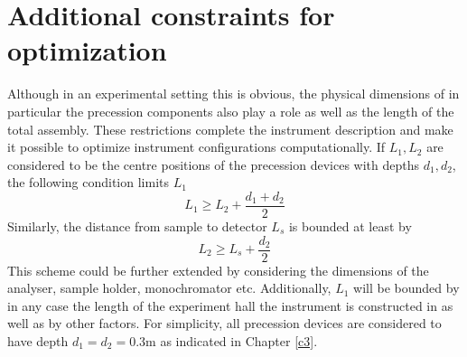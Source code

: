 
\section{Additional constraints for optimization}
\label{c5.1}
Although in an experimental setting this is obvious, the physical dimensions of in particular the precession components also play a role as well as the length of the total assembly. These restrictions complete the instrument description and make it possible to optimize instrument configurations computationally. If $L_1, L_2$ are considered to be the centre positions of the precession devices with depths $d_1, d_2$, the following condition limits $L_1$
$$L_1 \geq L_2 + \frac{d_1 + d_2}{2}$$
Similarly, the distance from sample to detector $L_s$ is bounded at least by
$$L_2 \geq L_s + \frac{d_2}{2}$$
This scheme could be further extended by considering the dimensions of the analyser, sample holder, monochromator etc. Additionally, $L_1$  will be bounded by in any case the length of the experiment hall the instrument is constructed in as well as by other factors. For simplicity, all precession devices are considered to have depth $d_1 = d_2 = 0.3\unit\meter$ as indicated in Chapter \ref{c3}. 


